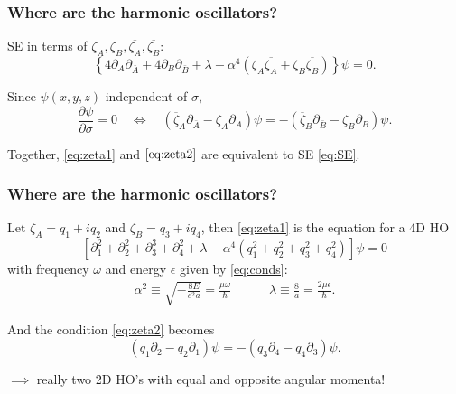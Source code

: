 \documentclass{beamer}
\theoremstyle{definition}
\newcommand{\lc}{\left\{}
\newcommand{\rc}{\right\}}
\newcommand{\p}{\partial}
\newcommand{\f}[2]{\frac{#1}{#2}}
\newcommand{\al}{\alpha}
\begin{document}
\begin{frame}
	\frametitle{Where are the harmonic oscillators?}
	SE in terms of $\zeta_A, \zeta_B, \overline{\zeta_A}, \overline{\zeta_B}$:
	\begin{equation}
	\label{eq:zeta1}
	\lc 4 \p_A \p_{\bar{A}} + 4 \p_B \p_{\bar{B}}  + \lambda - \al^4 (\zeta_A \overline{\zeta_A} + \zeta_B \overline{\zeta_B}) \rc \psi = 0.
	\end{equation}
	
	Since $\psi(x,y,z)$ independent of $\sigma$,
	\begin{equation}\label{eq:zeta2}
	\f{\p \psi}{\p \sigma} = 0 \quad \iff \quad 
	(\overline{\zeta}_A \p_{\bar{A}} - \zeta_A \p_{A})\psi =
	-(\overline{\zeta}_B \p_{\bar{B}} - \zeta_B \p_{B})\psi.
	\end{equation}
	
	Together, \eqref{eq:zeta1} and $\eqref{eq:zeta2}$ are equivalent to SE \eqref{eq:SE}. 
\end{frame}



\begin{frame}
	\frametitle{Where are the harmonic oscillators?}
	
	Let $\zeta_A = q_1 + iq_2$ and $\zeta_B = q_3 + iq_4$, then \eqref{eq:zeta1} is the equation for a 4D HO
	\begin{equation}\label{eq:4d-sho}
	[\p_1^2 + \p_2^2 + \p_3^3 + \p_4^2 + \lambda - \al^4(q_1^2 + q_2^2 + q_3^2 + q_4^2)] \psi = 0
	\end{equation}
	with frequency $\omega$ and energy $\epsilon$ given by \eqref{eq:conds}:
	\begin{align*}
	\al^2 \equiv \sqrt{-\f{8E}{e^2 a}} = \f{\mu \omega}{\hbar} 
	\quad\quad\quad 
	\lambda \equiv \f{8}{a} = \f{2\mu \epsilon}{\hbar}.
	\end{align*}
	
	And the condition \eqref{eq:zeta2} becomes
	\begin{equation}
	\label{eq:ang}
	(q_1 \p_2 - q_2 \p_1) \psi = -(q_3 \p_4 - q_4 \p_3)\psi.
	\end{equation}
	
	$\implies$ really two 2D HO's with equal and opposite angular momenta!
\end{frame}
\end{document}
